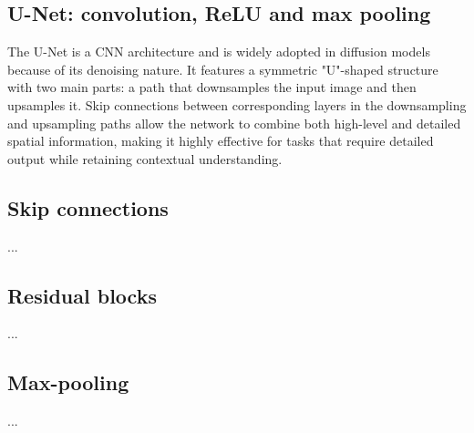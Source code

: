 \subsection{U-Net: convolution, ReLU and max pooling}
\label{appendix:unet}

The U-Net is a CNN architecture and is widely adopted in diffusion models because of its denoising nature. It features a symmetric "U"-shaped structure with two main parts: a path that downsamples the input image and then upsamples it. Skip connections between corresponding layers in the downsampling and upsampling paths allow the network to combine both high-level and detailed spatial information, making it highly effective for tasks that require detailed output while retaining contextual understanding.

\subsection*{Skip connections}
...

\subsection*{Residual blocks}
...

\subsection*{Max-pooling}
...

